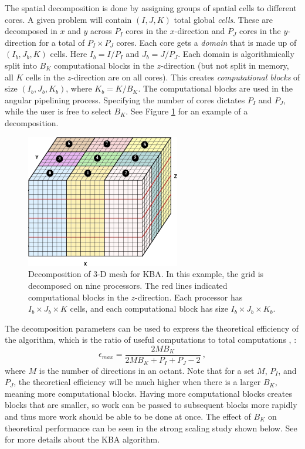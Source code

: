 The spatial decomposition is done by assigning groups of spatial cells to different cores. A given problem will contain $(I, J, K)$ total global \emph{cells}. These are decomposed in $x$ and $y$ across $P_{I}$ cores in the $x$-direction and $P_{J}$ cores in the $y$-direction for a total of $P_{I} \times P_{J}$ cores. Each core gets a \emph{domain} that is made up of $(I_{b}, J_{b}, K)$ cells. Here $I_{b} = I/P_{I}$ and $J_{b} = J/P_{J}$. Each domain is algorithmically split into $B_{K}$ computational blocks in the $z$-direction (but not split in memory, all $K$ cells in the $z$-direction are on all cores). This creates \emph{computational blocks} of size $(I_{b}, J_{b}, K_{b})$, where $K_{b} = K/B_{K}$. The computational blocks are used in the angular pipelining process. Specifying the number of cores dictates $P_{I}$ and $P_{J}$, while the user is free to select $B_{K}$. See Figure \ref{fig:BlockDecomp} for an example of a decomposition.

\begin{figure}[!ht]	
  \begin{center}
    \includegraphics [width=0.6\textwidth, height=0.4\textheight ] {BlockDecompCropped}
  \end{center}
  \caption{Decomposition of 3-D mesh for KBA. In this example, the grid is decomposed on nine processors. The red lines indicated computational blocks in the $z$-direction. Each processor has $I_{b} \times J_{b} \times K$ cells, and each computational block has size $I_{b} \times J_{b} \times K_{b}$.}
  \label{fig:BlockDecomp}
\end{figure}

The decomposition parameters can be used to express the theoretical efficiency of the algorithm, which is the ratio of useful computations to total computations \cite{Evans2009d}, \cite{Baker1998}:
%
\begin{equation}
  \epsilon_{max} = \frac{2MB_{K}}{2MB_{K} + P_{I} + P_{J} - 2} \:, 
  \label{eq:efficiency}
\end{equation}
%
where $M$ is the number of directions in an octant. Note that for a set $M$, $P_{I}$, and $P_{J}$, the theoretical efficiency will be much higher when there is a larger $B_{K}$, meaning more computational blocks. Having more computational blocks creates blocks that are smaller, so work can be passed to subsequent blocks more rapidly and thus more work should be able to be done at once. The effect of $B_{K}$ on theoretical performance can be seen in the strong scaling study shown below. See \cite{Baker1998} for more details about the KBA algorithm.

